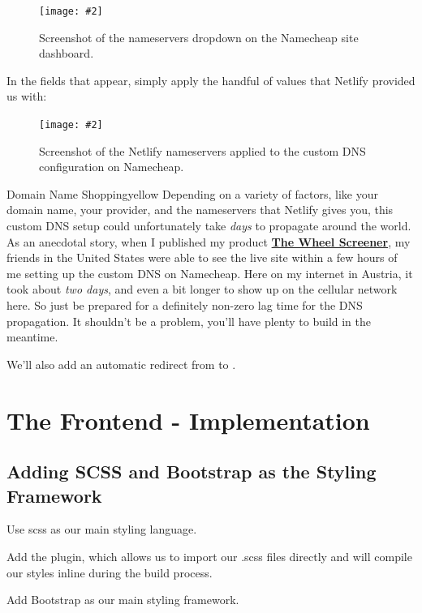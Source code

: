 \documentclass[a4paper,
                             oneside,
                             BCOR1.0cm,
                             DIV11,
                             parskip=full,
                             11pt]{scrbook}
\newcommand{\link}[2]{\textbf{\textcolor{monokaiPink}{\href{#2}{#1}}}}
\newcommand{\standardfigure}[3]{\begin{figure}[H]\begin{center}\texttt{[image: \#2]}\caption{#3}\end{center}\end{figure}}
\begin{document}
\standardfigure{\textwidth}{frontend/namecheap-custom-dns}{Screenshot of the nameservers dropdown on the Namecheap site dashboard.}

In the fields that appear, simply apply the handful of values that Netlify provided us with:

\standardfigure{\textwidth}{frontend/namecheap-custom-dns}{Screenshot of the Netlify nameservers applied to the custom DNS configuration on Namecheap.}

\begin{highlightBox}{Domain Name Shopping}{yellow}{\warning}
Depending on a variety of factors, like your domain name, your provider, and the nameservers that Netlify gives you, this custom DNS setup could unfortunately take \textit{days} to propagate around the world. As an anecdotal story, when I published my product \link{The Wheel Screener}{https://wheelscreener.com}, my friends in the United States were able to see the live site within a few hours of me setting up the custom DNS on Namecheap. Here on my internet in Austria, it took about \textit{two days}, and even a bit longer to show up on the cellular network here. So just be prepared for a definitely non-zero lag time for the DNS propagation. It shouldn't be a problem, you'll have plenty to build in the meantime. \wink
\end{highlightBox}


We'll also add an automatic redirect from  to .

\chapter{The Frontend - Implementation}\label{cap:primer}

\section{Adding SCSS and Bootstrap as the Styling Framework}\label{sec:titles}
\begin{arrows}
\item Use scss as our main styling language.
\item Add the  plugin, which allows us to import our .scss files directly and will compile our styles inline during the build process.
\item Add Bootstrap as our main styling framework.
\end{arrows}
\end{document}
